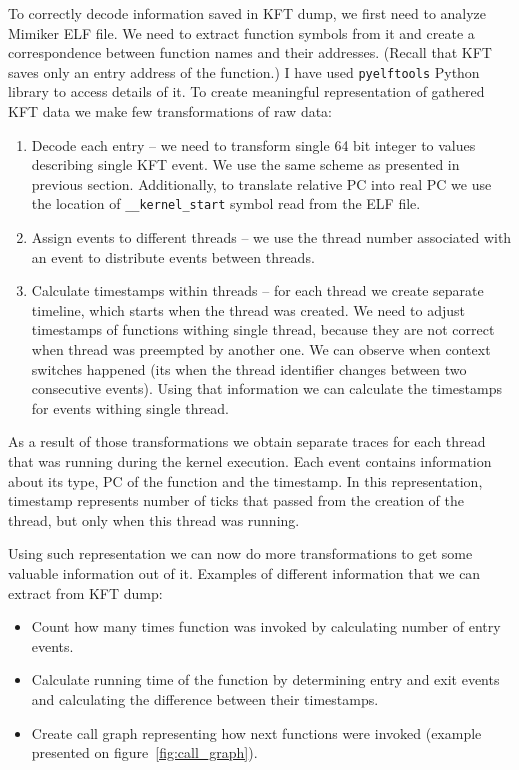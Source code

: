 To correctly decode information saved in KFT dump, we first need to analyze Mimiker ELF file.
We need to extract function symbols from it and create a correspondence between function names and their addresses.
(Recall that KFT saves only an entry address of the function.)
I have used {\tt pyelftools} Python library \cite{pyelftools:sources} to access details of it.
To create meaningful representation of gathered KFT data we make few transformations of raw data:
\begin{enumerate}
  \item Decode each entry -- we need to transform single 64 bit integer to values describing single KFT event.
    We use the same scheme as presented in previous section.
    Additionally, to translate relative PC into real PC we use the location of \texttt{__kernel_start} symbol read from the ELF file.
  \item Assign events to different threads -- we use the thread number associated with an event to distribute events between threads.
  \item Calculate timestamps within threads -- for each thread we create separate timeline, which starts when the thread was created.
    We need to adjust timestamps of functions withing single thread, because they are not correct when thread was preempted by another one.
    We can observe when context switches happened (its when the thread identifier changes between two consecutive events).
    Using that information we can calculate the timestamps for events withing single thread.
\end{enumerate}

As a result of those transformations we obtain separate traces for each thread that was running during the kernel execution.
Each event contains information about its type, PC of the function and the timestamp.
In this representation, timestamp represents number of ticks that passed from the creation of the thread, but only when this thread was running.

Using such representation we can now do more transformations to get some valuable information out of it.
Examples of different information that we can extract from KFT dump:

\begin{itemize}
  \item Count how many times function was invoked by calculating number of entry events.
  \item Calculate running time of the function by determining entry and exit events and calculating the difference between their timestamps.
  \item Create call graph representing how next functions were invoked (example presented on figure~\ref{fig:call_graph}).
\end{itemize}

